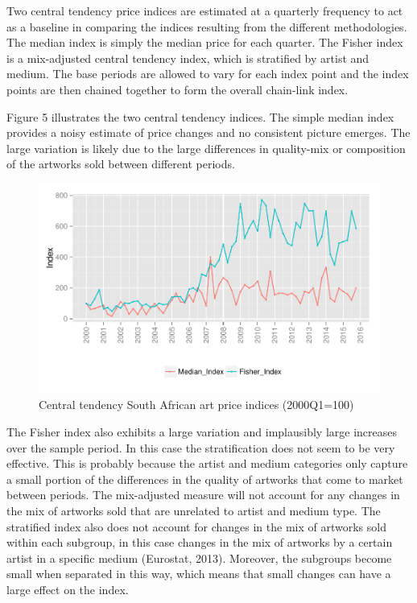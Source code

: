 \documentclass[12pt,]{article}
\begin{document}
Two central tendency price indices are estimated at a quarterly
frequency to act as a baseline in comparing the indices resulting from
the different methodologies. The median index is simply the median price
for each quarter. The Fisher index is a mix-adjusted central tendency
index, which is stratified by artist and medium. The base periods are
allowed to vary for each index point and the index points are then
chained together to form the overall chain-link index.

Figure 5 illustrates the two central tendency indices. The simple median
index provides a noisy estimate of price changes and no consistent
picture emerges. The large variation is likely due to the large
differences in quality-mix or composition of the artworks sold between
different periods.

\begin{figure}[htbp]
\centering
\includegraphics{Art_Price_Indices_3_files/figure-latex/figure5-1.pdf}
\caption{Central tendency South African art price indices (2000Q1=100)}
\end{figure}

The Fisher index also exhibits a large variation and implausibly large
increases over the sample period. In this case the stratification does
not seem to be very effective. This is probably because the artist and
medium categories only capture a small portion of the differences in the
quality of artworks that come to market between periods. The
mix-adjusted measure will not account for any changes in the mix of
artworks sold that are unrelated to artist and medium type. The
stratified index also does not account for changes in the mix of
artworks sold within each subgroup, in this case changes in the mix of
artworks by a certain artist in a specific medium (Eurostat, 2013).
Moreover, the subgroups become small when separated in this way, which
means that small changes can have a large effect on the index.
\end{document}
